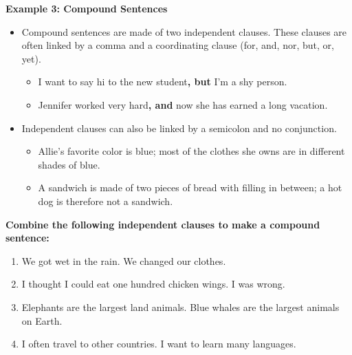 \documentclass[12pt]{article}
\begin{document}
\vspace{1em}
\begin{tcolorbox}[colframe=black!60, colback=white, 
coltitle=black, colbacktitle=black!15, fonttitle=\bfseries\Large, 
title=Examples, halign title=center, left=10pt, right=10pt, top=10pt, bottom=15pt]
\textbf{Example 3: Compound Sentences}
\begin{itemize}
    \item Compound sentences are made of two independent clauses. These clauses are often linked by a comma and a coordinating clause (for, and, nor, but, or, yet).
    \begin{itemize}
        \item I want to say hi to the new student\textbf{, but} I'm a shy person.
        \item Jennifer worked very hard\textbf{, and} now she has earned a long vacation.
    \end{itemize}
\item Independent clauses can also be linked by a semicolon and no conjunction.
\begin{itemize}
    \item Allie's favorite color is blue; most of the clothes she owns are in different shades of blue.
    \item A sandwich is made of two pieces of bread with filling in between; a hot dog is therefore not a sandwich.
\end{itemize}
\end{itemize}

     \end{tcolorbox}

\vspace{1em}

\begin{tcolorbox}[colframe=black!60, colback=white, 
coltitle=black, colbacktitle=black!15, fonttitle=\bfseries\Large, 
title=Guided Practice, halign title=center, left=10pt, right=10pt, top=10pt, bottom=15pt]
\textbf{Combine the following independent clauses to make a compound sentence:}
\begin{enumerate}[itemsep=3em] %
    \item We got wet in the rain. We changed our clothes.
    \item I thought I could eat one hundred chicken wings. I was wrong.
    \item Elephants are the largest land animals. Blue whales are the largest animals on Earth.
    \item I often travel to other countries. I want to learn many languages.
\vspace{3em}
\end{enumerate}
\end{tcolorbox}
\end{document}
